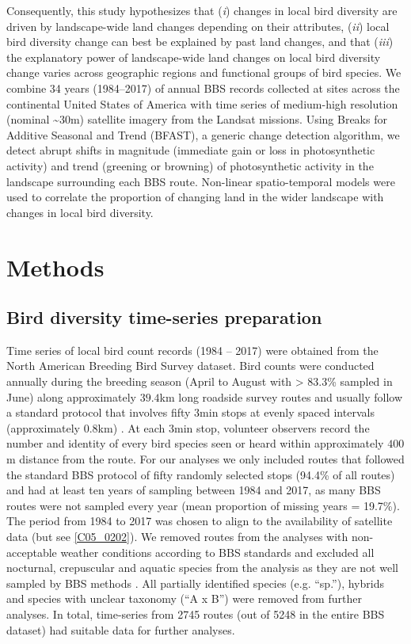 Consequently, this study hypothesizes that (\textit{i}) changes in local bird diversity are driven by landscape-wide land changes depending on their attributes, (\textit{ii}) local bird diversity change can best be explained by past land changes, and that (\textit{iii}) the explanatory power of landscape-wide land changes on local bird diversity change varies across geographic regions and functional groups of bird species. We combine 34 years (1984–2017) of annual BBS records collected at sites across the continental United States of America with time series of medium-high resolution (nominal \textasciitilde30m) satellite imagery from the Landsat missions. Using Breaks for Additive Seasonal and Trend (BFAST), a generic change detection algorithm, we detect abrupt shifts in magnitude (immediate gain or loss in photosynthetic activity) and trend (greening or browning) of photosynthetic activity in the landscape surrounding each BBS route. Non-linear spatio-temporal models were used to correlate the proportion of changing land in the wider landscape with changes in local bird diversity.

\section{Methods}
\label{C05_02}
\subsection{Bird diversity time-series preparation}
\label{C05_0201}

Time series of local bird count records (1984 – 2017) were obtained from the North American Breeding Bird Survey \citep[BBS, available from \href{https://www.pwrc.usgs.gov/bbs/}{https://www.pwrc.usgs.gov/bbs/},][]{Pardieck2018} dataset. Bird counts were conducted annually during the breeding season (April to August with > 83.3\% sampled in June) along approximately $39.4$km long roadside survey routes and usually follow a standard protocol that involves fifty $3$min stops at evenly spaced intervals (approximately $0.8$km) \citep{Ralph1995}. At each $3$min stop, volunteer observers record the number and identity of every bird species seen or heard within approximately $400$m distance from the route. For our analyses we only included routes that followed the standard BBS protocol of fifty randomly selected stops (94.4\% of all routes) and had at least ten years of sampling between 1984 and 2017, as many BBS routes were not sampled every year (mean proportion of missing years = 19.7\%). The period from 1984 to 2017 was chosen to align to the availability of satellite data (but see \ref{C05_0202}). We removed routes from the analyses with non-acceptable weather conditions according to BBS standards \citep{Ralph1995} and excluded all nocturnal, crepuscular and aquatic species from the analysis as they are not well sampled by BBS methods \citep{Gutzwiller2015,Jarzyna2017}. All partially identified species (e.g. “sp.”), hybrids and species with unclear taxonomy (\eg  “A x B”) were removed from further analyses. In total, time-series from 2745 routes (out of 5248 in the entire BBS dataset) had suitable data for further analyses.

